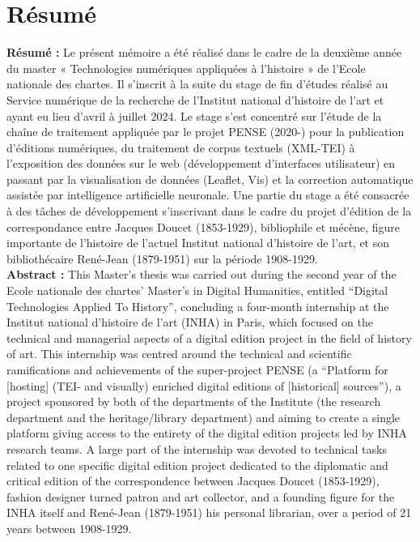 \chapter{Résumé}

\textbf{Résumé :}
	Le présent mémoire a été réalisé dans le cadre de la deuxième année du master « Technologies numériques appliquées à l’histoire » de l’Ecole nationale des chartes. Il s’inscrit à la suite du stage de fin d’études réalisé au Service numérique de la recherche de l’Institut national d’histoire de l’art et ayant eu lieu d’avril à juillet 2024. Le stage s'est concentré sur l'étude de la chaîne de traitement appliquée par le projet PENSE (2020-) pour la publication d'éditions numériques, du traitement de corpus textuels (XML-TEI) à l'exposition des données sur le web (développement d'interfaces utilisateur) en passant par la visualisation de données (Leaflet, Vis) et la correction automatique assistée par intelligence artificielle neuronale. Une partie du stage a été consacrée à des tâches de développement s’inscrivant dans le cadre du projet d'édition de la correspondance entre Jacques Doucet (1853-1929), bibliophile et mécène, figure importante de l'histoire de l'actuel Institut national d'histoire de l'art, et son bibliothécaire René-Jean (1879-1951) sur la période 1908-1929. \\

 \textbf{Abstract :}
    This Master’s thesis was carried out during the second year of the Ecole nationale des chartes’ Master’s in Digital Humanities, entitled “Digital Technologies Applied To History”, concluding a four-month internship at the Institut national d’histoire de l’art (INHA) in Paris, which focused on the technical and managerial aspects of a digital edition project in the field of history of art. This internship was centred around the technical and scientific ramifications and achievements of the super-project PENSE (a “Platform for [hosting] (TEI- and visually) enriched digital editions of [historical] sources”), a project sponsored by both of the departments of the Institute (the research department and the heritage/library department) and aiming to create a single platform giving access to the entirety of the digital edition projects led by INHA research teams. A large part of the internship was devoted to technical tasks related to one specific digital edition project dedicated to the diplomatic and critical edition of the correspondence between Jacques Doucet (1853-1929), fashion designer turned patron and art collector, and a founding figure for the INHA itself and René-Jean (1879-1951) his personal librarian, over a period of 21 years between 1908-1929. \\
	
